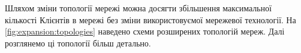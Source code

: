 \documentclass[a4paper,ukrainian,utf8,nocolumnsxix,nocolumnxxxii,nocolumnxxxi,floatsection,equationsection]{eskdtext}
\begin{document}
Шляхом зміни топології мережі можна досягти збільшення максимальної кількості Клієнтів в мережі без зміни використовуємої мережевої технології. На \cref{fig:expansion:topologies} наведено схеми розширених топологій мереж. Далі розглянемо ці топології більш детально.

\begin{figure}[htb]

	\centering
	\qquad
\end{figure}
\end{document}
